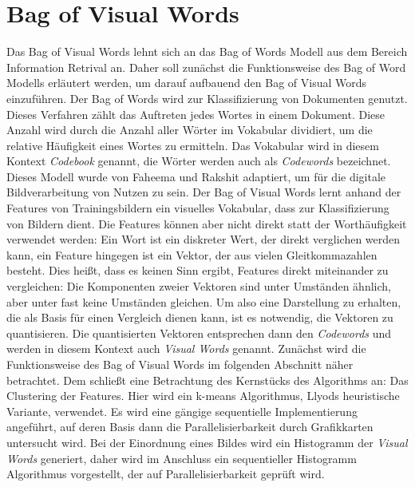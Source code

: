 \section{Bag of Visual Words}

Das Bag of Visual Words lehnt sich an das Bag of Words Modell aus dem Bereich Information Retrival an. Daher soll zunächst die Funktionsweise des Bag of Word Modells erläutert werden, um darauf aufbauend den Bag of Visual Words einzuführen.\newline 
Der Bag of Words wird zur Klassifizierung von Dokumenten genutzt. Dieses Verfahren zählt das Auftreten jedes Wortes in einem Dokument. Diese Anzahl wird durch die Anzahl aller Wörter im Vokabular dividiert, um die relative Häufigkeit eines Wortes zu ermitteln. Das Vokabular wird in diesem Kontext \textit{Codebook} genannt, die Wörter werden auch als \textit{Codewords} bezeichnet.\newline
Dieses Modell wurde von Faheema und Rakshit \cite{bow2010} adaptiert, um für die digitale Bildverarbeitung von Nutzen zu sein. Der Bag of Visual Words lernt anhand der Features von Trainingsbildern ein visuelles Vokabular, dass zur Klassifizierung von Bildern dient. Die Features können aber nicht direkt statt der Worthäufigkeit verwendet werden: Ein Wort ist ein diskreter Wert, der direkt verglichen werden kann, ein Feature hingegen ist ein Vektor, der aus vielen Gleitkommazahlen besteht. Dies heißt, dass es keinen Sinn ergibt, Features direkt miteinander zu vergleichen: Die Komponenten zweier Vektoren sind unter Umständen ähnlich, aber unter fast keine Umständen gleichen. Um also eine Darstellung zu erhalten, die als Basis für einen Vergleich dienen kann, ist es notwendig, die Vektoren zu quantisieren. Die quantisierten Vektoren entsprechen dann den \textit{Codewords} und werden in diesem Kontext auch \textit{Visual Words} genannt. \newline
Zunächst wird die Funktionsweise des Bag of Visual Words im folgenden Abschnitt näher betrachtet. Dem schließt eine Betrachtung des Kernstücks des Algorithms an: Das Clustering der Features. Hier wird ein k-means Algorithmus, Llyods heuristische Variante, verwendet. Es wird eine gängige sequentielle Implementierung angeführt, auf deren Basis dann die Parallelisierbarkeit durch Grafikkarten untersucht wird.\newline
Bei der Einordnung eines Bildes wird ein Histogramm der \textit{Visual Words} generiert, daher wird im Anschluss ein sequentieller Histogramm Algorithmus vorgestellt, der auf Parallelisierbarkeit geprüft wird.


